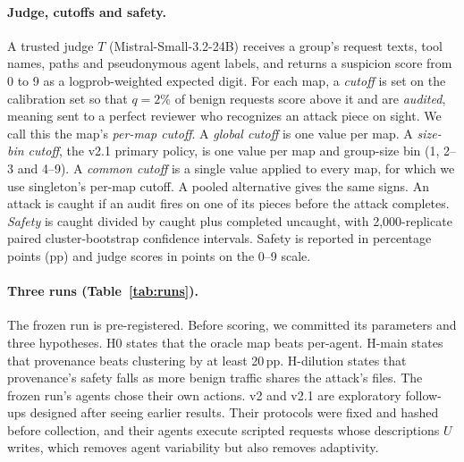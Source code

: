\documentclass[10pt]{article}
\newcommand{\pp}{\,pp}
\begin{document}
\paragraph{Judge, cutoffs and safety.} A trusted judge $T$ (Mistral-Small-3.2-24B) receives a group's request texts, tool names, paths and pseudonymous agent labels, and returns a suspicion score from 0 to 9 as a logprob-weighted expected digit. For each map, a \emph{cutoff} is set on the calibration set so that $q=2\%$ of benign requests score above it and are \emph{audited}, meaning sent to a perfect reviewer who recognizes an attack piece on sight. We call this the map's \emph{per-map cutoff}. A \emph{global cutoff} is one value per map. A \emph{size-bin cutoff}, the v2.1 primary policy, is one value per map and group-size bin (1, 2--3 and 4--9). A \emph{common cutoff} is a single value applied to every map, for which we use singleton's per-map cutoff. A pooled alternative gives the same signs. An attack is caught if an audit fires on one of its pieces before the attack completes. \emph{Safety} is caught divided by caught plus completed uncaught, with 2,000-replicate paired cluster-bootstrap confidence intervals. Safety is reported in percentage points (pp) and judge scores in points on the 0--9 scale.

\paragraph{Three runs (Table~\ref{tab:runs}).} The frozen run is pre-registered. Before scoring, we committed its parameters and three hypotheses. H0 states that the oracle map beats per-agent. H-main states that provenance beats clustering by at least 20\pp. H-dilution states that provenance's safety falls as more benign traffic shares the attack's files. The frozen run's agents chose their own actions. v2 and v2.1 are exploratory follow-ups designed after seeing earlier results. Their protocols were fixed and hashed before collection, and their agents execute scripted requests whose descriptions $U$ writes, which removes agent variability but also removes adaptivity.
\end{document}
